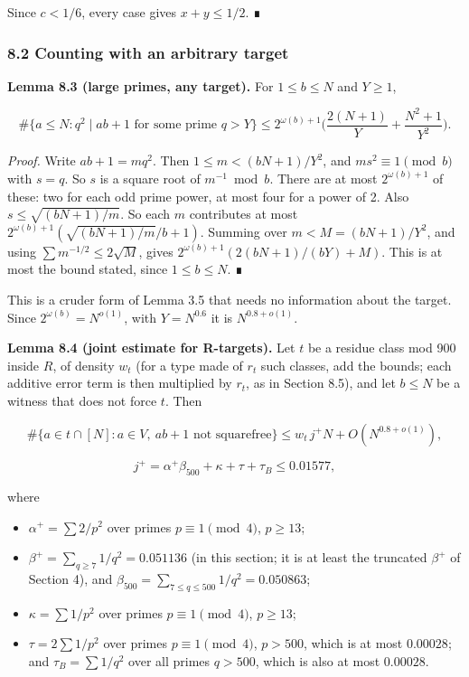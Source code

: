 \documentclass[
  11pt,
]{article}
\providecommand{\tightlist}{%
  \setlength{\itemsep}{0pt}\setlength{\parskip}{0pt}}
\begin{document}
Since \(c < 1/6\), every case gives \(x + y \le 1/2\). ∎

\subsubsection{8.2 Counting with an arbitrary target}

\textbf{Lemma 8.3 (large primes, any target).} For \(1 \le b \le N\) and
\(Y \ge 1\),

\[\#\{a\le N : q^2\mid ab+1 \text{ for some prime } q>Y\} \le 2^{\omega(b)+1}\Big(\frac{2(N+1)}{Y}+\frac{N^2+1}{Y^2}\Big).\]

\emph{Proof.} Write \(ab + 1 = mq^2\). Then \(1 \le m < (bN + 1)/Y^2\),
and \(ms^2 \equiv 1 \pmod{b}\) with \(s = q\). So \(s\) is a square root
of \(m^{-1} \bmod b\). There are at most \(2^{\omega(b)+1}\) of these:
two for each odd prime power, at most four for a power of 2. Also
\(s \le \sqrt{(bN + 1)/m}\). So each \(m\) contributes at most
\(2^{\omega(b)+1}(\sqrt{(bN + 1)/m}/b + 1)\). Summing over
\(m < M = (bN + 1)/Y^2\), and using \(\sum m^{-1/2} \le 2\sqrt{M}\),
gives \(2^{\omega(b)+1}(2(bN + 1)/(bY) + M)\). This is at most the bound
stated, since \(1 \le b \le N\). ∎

This is a cruder form of Lemma 3.5 that needs no information about the
target. Since \(2^{\omega(b)} = N^{o(1)}\), with \(Y = N^{0.6}\) it is
\(N^{0.8+o(1)}\).

\textbf{Lemma 8.4 (joint estimate for R-targets).} Let \(t\) be a
residue class mod 900 inside \(R\), of density \(w_t\) (for a type made
of \(r_t\) such classes, add the bounds; each additive error term is
then multiplied by \(r_t\), as in Section 8.5), and let \(b \le N\) be a
witness that does not force \(t\). Then

\[\#\{a\in t\cap[N] : a\in V,\ ab+1 \text{ not squarefree}\} \le w_t\, j^{+} N + O(N^{0.8+o(1)}),\]

\[j^{+} = \alpha^{+}\beta_{500} + \kappa + \tau + \tau_B \le 0.01577,\]

where

\begin{itemize}
\tightlist
\item
  \(\alpha^{+} = \sum 2/p^2\) over primes \(p \equiv 1 \pmod{4}\),
  \(p \ge 13\);
\item
  \(\beta^{+} = \sum_{q\ge 7} 1/q^2 = 0.051136\) (in this section; it is
  at least the truncated \(\beta^{+}\) of Section 4), and
  \(\beta_{500} = \sum_{7\le q\le 500} 1/q^2 = 0.050863\);
\item
  \(\kappa = \sum 1/p^2\) over primes \(p \equiv 1 \pmod{4}\),
  \(p \ge 13\);
\item
  \(\tau = 2\sum 1/p^2\) over primes \(p \equiv 1 \pmod{4}\),
  \(p > 500\), which is at most \(0.00028\); and \(\tau_B = \sum 1/q^2\)
  over all primes \(q > 500\), which is also at most \(0.00028\).
\end{itemize}
\end{document}
